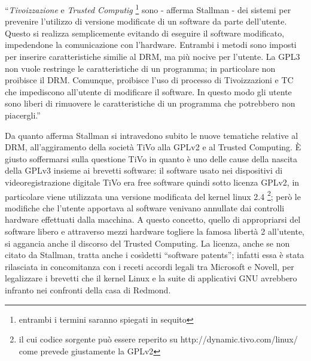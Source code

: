 
``\textit{Tivoizzazione} e \textit{Trusted Computig} \footnote{entrambi i termini saranno spiegati in sequito} sono - afferma Stallman - dei sistemi per prevenire l'utilizzo di versione modificate di un software da parte dell'utente. Questo si realizza semplicemente evitando di eseguire il software modificato, impedendone la comunicazione con l'hardware. Entrambi i metodi sono imposti per inserire caratteristiche similie al DRM, ma più nocive per l'utente. La GPL3 non vuole restringe le caratteristiche di un programma; in particolare non proibisce il DRM. Comunque, proibisce l'uso di processo di Tivoizzazioni e TC che impediscono all'utente di modificare il software. In questo modo gli utente sono liberi di rimuovere le caratteristiche di un programma che potrebbero non piacergli.''

Da quanto afferma Stallman si intravedono subito le nuove tematiche relative al DRM, all'aggiramento della società TiVo alla GPLv2 e al Trusted Computing. \`E giusto soffermarsi sulla questione TiVo in quanto è uno delle cause della nascita della GPLv3 insieme ai brevetti software: il software usato nei dispositivi di videoregistrazione digitale TiVo era free software quindi sotto licenza GPLv2, in particolare viene utilizzata una versione modificata del kernel linux 2.4 \footnote{il cui codice sorgente può essere reperito su http://dynamic.tivo.com/linux/ come prevede giustamente la GPLv2 }; però le modifiche che l'utente apportava al software venivano annullate dai controlli hardware effettuati dalla macchina. A questo concetto, quello di appropriarsi del software libero e attraverso mezzi hardware togliere la famosa libertà 2 all'utente, si aggancia anche il discorso del Trusted Computing. La licenza, anche se non citato da Stallman, tratta anche i cosìdetti ``software patents''; infatti essa è stata rilasciata in concomitanza con i receti accordi legali tra Microsoft e Novell, per legalizzare i brevetti che il kernel Linux e la suite di applicativi GNU avrebbero infranto nei confronti della casa di Redmond.

